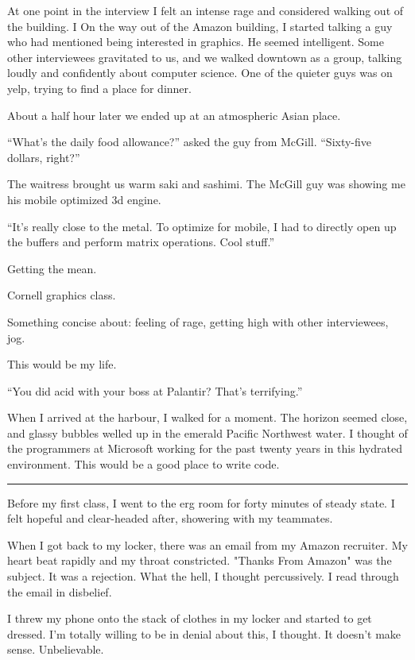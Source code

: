 At one point in the interview I felt an intense rage and considered walking out
of the building.  I
On the way out of the Amazon building, I started talking a guy who had mentioned
being interested in graphics.  He seemed intelligent.  Some other interviewees
gravitated to us, and we walked downtown as a group, talking loudly and
confidently about computer science.  One of the quieter guys was on yelp, trying
to find a place for dinner.

About a half hour later we ended up at an atmospheric Asian place.

``What's the daily food allowance?'' asked the guy from McGill. ``Sixty-five
dollars, right?''

The waitress brought us warm saki and sashimi.  The McGill guy was showing me
his mobile optimized 3d engine.

``It's really close to the metal.  To optimize for mobile, I had to directly
open up the buffers and perform matrix operations.  Cool stuff.''

Getting the mean.

Cornell graphics class.

Something concise about: feeling of rage, getting high with other interviewees, jog.

This would be my life.

``You did acid with your boss at Palantir?  That's terrifying.''

When I arrived at the harbour, I walked for a moment.  The horizon seemed close,
and glassy bubbles welled up in the emerald Pacific Northwest water.  I thought
of the programmers at Microsoft working for the past twenty years in this
hydrated environment.  This would be a good place to write code.

\plainfancybreak{12pt}{2}{* * *}

Before my first class, I went to the erg room for forty minutes of steady state.
I felt hopeful and clear-headed after, showering with my teammates.

When I got back to my locker, there was an email from my Amazon recruiter.  My
heart beat rapidly and my throat constricted.  "Thanks From Amazon" was the
subject.  It was a rejection.  What the hell, I thought percussively.  I read
through the email in disbelief.

I threw my phone onto the stack of clothes in my locker and started to get
dressed.  I'm totally willing to be in denial about this, I thought.  It doesn't
make sense.  Unbelievable.

